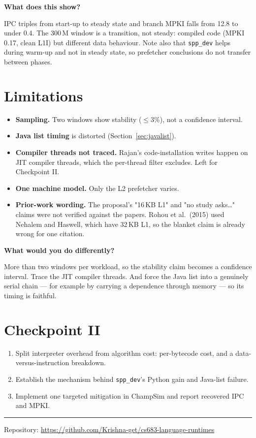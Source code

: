 \documentclass[11pt,a4paper]{article}
\newcommand{\Q}[1]{\begin{question}\textbf{#1}\end{question}}
\begin{document}
\Q{What does this show?}

IPC triples from start-up to steady state and branch MPKI falls from 12.8 to under 0.4. The
300\,M window is a transition, not steady: compiled code (MPKI 0.17, clean L1I) but different
data behaviour. Note also that \texttt{spp\_dev} helps during warm-up and not in steady state,
so prefetcher conclusions do not transfer between phases.

\section{Limitations}

\begin{itemize}[leftmargin=*]
  \item \textbf{Sampling.} Two windows show stability ($\le 3\%$), not a confidence interval.
  \item \textbf{Java list timing} is distorted (Section~\ref{sec:javalist}).
  \item \textbf{Compiler threads not traced.} Rajan's code-installation writes happen on JIT
        compiler threads, which the per-thread filter excludes. Left for Checkpoint II.
  \item \textbf{One machine model.} Only the L2 prefetcher varies.
  \item \textbf{Prior-work wording.} The proposal's "16\,KB L1" and "no study asks\ldots" claims
        were not verified against the papers. Rohou et al.\ (2015) used Nehalem and Haswell,
        which have 32\,KB L1, so the blanket claim is already wrong for one citation.
\end{itemize}

\Q{What would you do differently?}

More than two windows per workload, so the stability claim becomes a confidence interval. Trace
the JIT compiler threads. And force the Java list into a genuinely serial chain --- for example
by carrying a dependence through memory --- so its timing is faithful.

\section{Checkpoint II}

\begin{enumerate}[leftmargin=*]
  \item Split interpreter overhead from algorithm cost: per-bytecode cost, and a data-versus-instruction breakdown.
  \item Establish the mechanism behind \texttt{spp\_dev}'s Python gain and Java-list failure.
  \item Implement one targeted mitigation in ChampSim and report recovered IPC and MPKI.
\end{enumerate}

\vspace{1em}
\noindent\rule{\textwidth}{0.4pt}
\vspace{0.5em}

\noindent\small Repository: \url{https://github.com/Krishna-get/cs683-language-runtimes}
\end{document}
